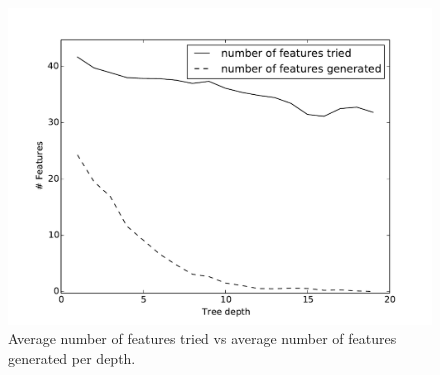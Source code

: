 \documentclass[twoside,11pt]{article}
\theoremstyle{definition}
\begin{document}
\begin{figure}[h!]
	\centering
	\includegraphics[scale=0.4]{features_per_depth}
	\caption{Average number of features tried vs average number of features generated per depth.}
	\label{fig:features_per_depth}
\end{figure}


\end{document}
